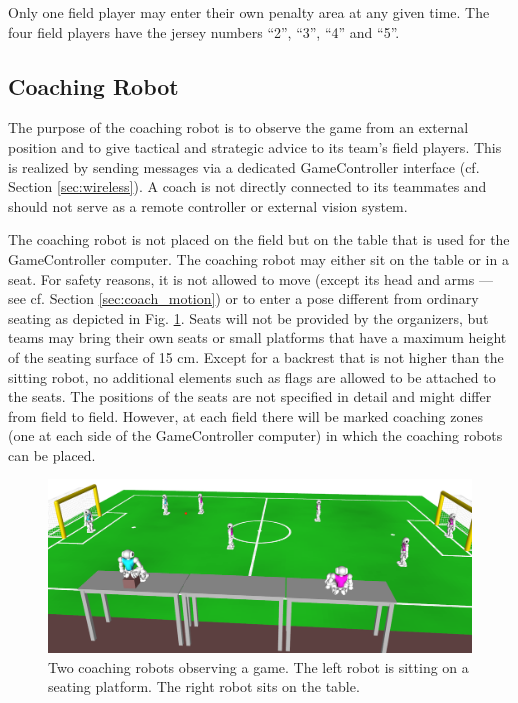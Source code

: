 \documentclass[12pt]{article}
\newcommand{\cf}{\mbox{cf.}\xspace}
\begin{document}
Only one field player may enter their own penalty area at any given time. The four field players have the jersey numbers ``2'', ``3'', ``4'' and ``5''.

\subsection{Coaching Robot}
\label{sec:coaching_robot}

The purpose of the coaching robot is to observe the game from an external position and to give tactical and strategic advice to its team's field players. This is realized by sending messages via a dedicated GameController interface (\cf Section \ref{sec:wireless}). A coach is not directly connected to its teammates and should not serve as a remote controller or external vision system.

The coaching robot is not placed on the field but on the table that is used for the GameController computer. The coaching robot may either sit on the table or in a seat. For safety reasons, it is not allowed to move (except its head and arms --- see \cf Section \ref{sec:coach_motion}) or to enter a pose different from ordinary seating as depicted in Fig. \ref{fig:coaches}.  Seats will not be provided by the organizers, but teams may bring their own seats or small platforms that have a maximum height of the seating surface of 15 cm. Except for a backrest that is not higher than the sitting robot, no additional elements such as flags are allowed to be attached to the seats. The positions of the seats are not specified in detail and might differ from field to field. However, at each field there will be marked coaching zones (one at each side of the GameController computer) in which the coaching robots can be placed.

\begin{figure}[t]
\centerline{\includegraphics[width=\columnwidth]{figs/coaching-robots}}
\caption{Two coaching robots observing a game. The left robot is sitting on a seating platform. The right robot sits on the table.}
\label{fig:coaches}
\end{figure}
 
\end{document}
